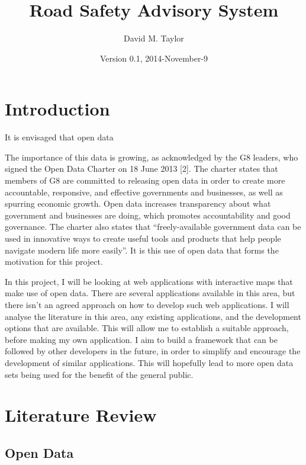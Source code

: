 \documentclass[authoryearcitations]{UoYCSproject}
\author{David M. Taylor}
\title{Road Safety Advisory System}
\date{Version 0.1, 2014-November-9}
\begin{document}
\maketitle
\listoffigures
\listoftables
\renewcommand*{\lstlistlistingname}{List of Listings}
\lstlistoflistings

\cleardoublepage
\label{sec:start}
\thispagestyle{empty}\cleardoublepage

\chapter{Introduction}
\label{cha:Introduction}

It is envisaged that open data 

The importance of this data is growing, as acknowledged by the G8 leaders, who signed the Open Data Charter on 18 June 2013 [2]. The charter states that members of G8 are committed to releasing open data in order to create more accountable, responsive, and effective governments and businesses, as well as spurring economic growth. Open data increases transparency about what government and businesses are doing, which promotes accountability and good governance. The charter also states that “freely-available government data can be used in innovative ways to create useful tools and products that help people navigate modern life more easily”. It is this use of open data that forms the motivation for this project. 

In this project, I will be looking at web applications with interactive maps that make use of open data. There are several applications available in this area, but there isn't an agreed approach on how to develop such web applications. I will analyse the literature in this area, any existing applications, and the development options that are available. This will allow me to establish a suitable approach, before making my own application. I aim to build a framework that can be followed by other developers in the future, in order to simplify and encourage the development of similar applications. This will hopefully lead to more open data sets being used for the benefit of the general public.
\citep{KopkaDaly1999}

\chapter{Literature Review}
\section{Open Data}
\end{document}
